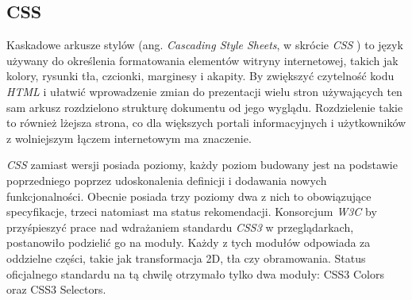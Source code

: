 \documentclass{iiuwb}
\begin{document}
\subsection{CSS}

Kaskadowe arkusze stylów 	(ang. \textit{Cascading Style Sheets}, w skrócie \textit{CSS} \cite{Etemad:11:CSS}) to język używany do określenia formatowania elementów witryny internetowej, takich jak kolory, rysunki tła, czcionki, marginesy i akapity. By zwiększyć czytelność kodu \textit{HTML} i ułatwić wprowadzenie zmian do prezentacji wielu stron używających ten sam arkusz rozdzielono strukturę dokumentu od jego wyglądu. Rozdzielenie takie to również lżejsza strona, co dla  większych portali informacyjnych i użytkowników z wolniejszym łączem internetowym ma znaczenie. 

\textit{CSS} zamiast wersji posiada poziomy, każdy poziom budowany jest na podstawie poprzedniego poprzez udoskonalenia definicji i dodawania nowych funkcjonalności. Obecnie posiada trzy poziomy dwa z nich to obowiązujące specyfikacje, trzeci natomiast ma status rekomendacji. Konsorcjum \textit{W3C}  by przyśpieszyć prace nad wdrażaniem standardu \textit{CSS3} w przeglądarkach, postanowiło podzielić go na moduły. Każdy z tych modułów odpowiada za oddzielne części, takie jak transformacja 2D, tła czy obramowania. Status oficjalnego standardu na tą chwilę otrzymało tylko dwa moduły: CSS3 Colors oraz CSS3 Selectors.
\end{document}
